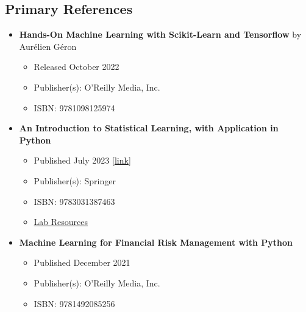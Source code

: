 \documentclass[a4paper, 12pt]{article}
\begin{document}
\subsection{Primary References}
\begin{itemize}
    \item \textbf{Hands-On Machine Learning with Scikit-Learn and Tensorflow} by Aur\'elien G\'eron
    \begin{itemize}
        \item Released October 2022
        \item Publisher(s): O'Reilly Media, Inc.
        \item ISBN: 9781098125974
    \end{itemize}

    \item \textbf{An Introduction to Statistical Learning, with Application in Python}
    \begin{itemize}
        \item Published July 2023 [\href{www.statlearning.com}{link}]
        \item Publisher(s): Springer
        \item ISBN: 9783031387463
        \item \href{https://www.statlearning.com/resources-python}{Lab Resources}
    \end{itemize}

    \item \textbf{Machine Learning for Financial Risk Management with Python}
    \begin{itemize}
        \item Published December 2021
        \item Publisher(s): O'Reilly Media, Inc.
        \item ISBN: 9781492085256
    \end{itemize}
\end{itemize}
\end{document}
